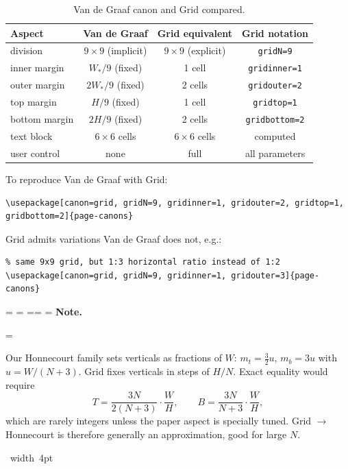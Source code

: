 \documentclass[11pt, twoside, openany]{book}
\makeatletter
\newcommand*{\cns@tag@artifact@begin}{}
\newcommand*{\cns@tag@artifact@end}{}
\newenvironment{TodoNote}[1][]{%
  \par\addvspace{0.5\baselineskip plus 2pt}%
  \setbox\cns@box=\vbox\bgroup
    \hsize=\linewidth
    \advance\hsize -10pt
    \linewidth=\hsize \columnwidth=\hsize
    \parindent=\z@
    \noindent\textbf{\sffamily Note\cns@ifnotempty{#1}{ \textmd{(#1)}}.}%
    \par\nobreak
    \@afterindentfalse\@afterheading
    \leftskip=\cns@indent\relax
    \ignorespaces
}{%
  \par
  \egroup
  \vbox{\hbox{%
    \cns@tag@artifact@begin\vrule width 4pt\cns@tag@artifact@end
    \hskip 6pt\relax
    \box\cns@box
  }}%
  \par\addvspace{0.5\baselineskip plus 2pt}%
}
\makeatother
\begin{document}
\begin{table}[h]
	\centering
	\caption{Van de Graaf canon and Grid compared.}
	\label{tab:vdggrid}
	\begin{tabular}{@{}lccc@{}}
		\toprule
		\bfseries Aspect & \bfseries Van de Graaf  & \bfseries Grid equivalent & \bfseries Grid notation \\
		\midrule
		division         & $9 \times 9$ (implicit) & $9 \times 9$ (explicit)   & \texttt{gridN=9}        \\
		inner margin     & $W_\ast/9$ (fixed)      & 1 cell                    & \texttt{gridinner=1}    \\
		outer margin     & $2W_\ast/9$ (fixed)     & 2 cells                   & \texttt{gridouter=2}    \\
		top margin       & $H/9$ (fixed)           & 1 cell                    & \texttt{gridtop=1}      \\
		bottom margin    & $2H/9$ (fixed)          & 2 cells                   & \texttt{gridbottom=2}   \\
		text block       & $6 \times 6$ cells      & $6 \times 6$ cells        & computed                \\
		user control     & none                    & full                      & all parameters          \\
		\bottomrule
	\end{tabular}
\end{table}

To reproduce Van de Graaf with Grid:
\begin{fullwidth}
	\begin{verbatim}
\usepackage[canon=grid, gridN=9, gridinner=1, gridouter=2, gridtop=1, gridbottom=2]{page-canons}
	\end{verbatim}
\end{fullwidth}

Grid admits variations Van de Graaf does not, e.g.:
\begin{verbatim}
% same 9x9 grid, but 1:3 horizontal ratio instead of 1:2
\usepackage[canon=grid, gridN=9, gridinner=1, gridouter=3]{page-canons}
\end{verbatim}

\begin{TodoNote}
	Our Honnecourt family sets verticals as fractions of $W$: $m_t = \tfrac{3}{2}u$, $m_b = 3u$ with $u = W/(N+3)$. Grid fixes verticals in steps of $H/N$. Exact equality would require
	\[
		T = \frac{3N}{2(N+3)}\cdot \frac{W}{H},\qquad
		B = \frac{3N}{N+3}\cdot \frac{W}{H},
	\]
	which are rarely integers unless the paper aspect is specially tuned. Grid $\to$ Honnecourt is therefore generally an approximation, good for large $N$.
\end{TodoNote}
\end{document}
